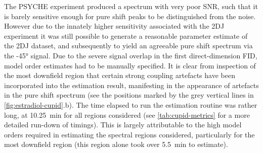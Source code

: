 The \ac{PSYCHE} experiment produced a spectrum with very poor
\ac{SNR}, such that it is barely sensitive enough for pure shift peaks to be
distinguished from the noise. However due to the innately higher
sensitivity associated with the \ac{2DJ} experiment it was still possible to
generate a reasonable parameter estimate of the \ac{2DJ} dataset, and
subsequently to yield an agreeable pure shift spectrum via the \ang{-45}
signal. Due to the severe signal overlap in the first
direct-dimension \ac{FID}, model order estimates had to be
manually specified. It is clear from inspection of the most downfield region
that certain strong coupling artefacts have been incorporated into the
estimation result, manifesting in the appearance of artefacts in the pure shift
spectrum (see the positions marked by the grey vertical lines in
\cref{fig:estradiol-cupid}.b).
The time elapsed to run the estimation routine was rather
long, at \qty{10.25}{\minute} for all regions considered (see
\cref{tab:cupid-metrics} for a more detailed run-down of timings). This is
largely attributable to the high model orders required in estimating the
spectral regions considered, particularly for the most downfield region (this
region alone took over \qty{5.5}{\minute} to estimate).
